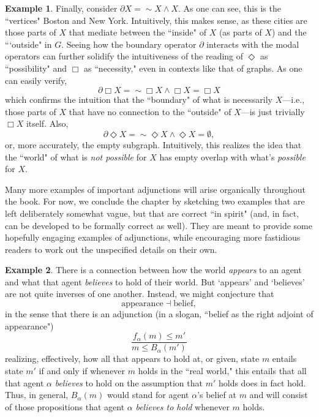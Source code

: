 \documentclass[11pt]{book}
\theoremstyle{definition}
\newtheorem{example}{Example}[section]
\theoremstyle{definition}
\theoremstyle{definition}
\theoremstyle{theorem}
\theoremstyle{definition}
\begin{document}
\begin{example}
	Finally, consider $\partial X = \sim X \wedge X$. As one can see, this is the ``vertices" Boston and New York. Intuitively, this makes sense, as these cities are those parts of $X$ that mediate between the ``inside" of $X$ (as parts of $X$) and the ```outside" in $G$. Seeing how the boundary operator $\partial$ interacts with the modal operators can further solidify the intuitiveness of the reading of $\Diamond$ as ``possibility" and $\Box$ as ``necessity," even in contexts like that of graphs. As one can easily verify, 
	\begin{equation*}
	\partial \Box X = \sim \Box X \wedge \Box X = \Box X
	\end{equation*}   
	which confirms the intuition that the ``boundary" of what is necessarily $X$---i.e., those parts of $X$ that have no connection to the ``outside" of $X$---is just trivially $\Box X$ itself. Also, 
	\begin{equation*}
	\partial \Diamond X = \sim \Diamond X \wedge \Diamond X = \emptyset,
	\end{equation*}  
	or, more accurately, the empty subgraph. Intuitively, this realizes the idea that the ``world" of what is \textit{not possible} for $X$ has empty overlap with what's \textit{possible} for $X$. 
\end{example} 
Many more examples of important adjunctions will arise organically throughout the book. For now, we conclude the chapter by sketching two examples that are left deliberately somewhat vague, but that are correct ``in spirit" (and, in fact, can be developed to be formally correct as well). They are meant to provide some hopefully engaging examples of adjunctions, while encouraging more fastidious readers to work out the unspecified details on their own. 
\begin{example}
	There is a connection between how the world \textit{appears} to an agent and what that agent \textit{believes} to hold of their world. But `appears' and `believes' are not quite inverses of one another. Instead, we might conjecture that
	\begin{equation*}
	\text{appearance} \dashv \text{belief}, 
	\end{equation*}
	in the sense that there is an adjunction (in a slogan, ``belief as the right adjoint of appearance")
	\begin{equation*}
	\frac{f_{\alpha}(m) \leq m'}{m \leq B_{\alpha}(m')} 
	\end{equation*} 
	realizing, effectively, how all that appears to hold at, or given, state $m$ entails state $m'$ if and only if whenever $m$ holds in the ``real world," this entails that all that agent $\alpha$ \textit{believes} to hold on the assumption that $m'$ holds does in fact hold.  Thus, in general, $B_{\alpha}(m)$ would stand for agent $\alpha$'s belief at $m$ and will consist of those propositions that agent $\alpha$ \textit{believes to hold} whenever $m$ holds. 
\end{example}
\end{document}
